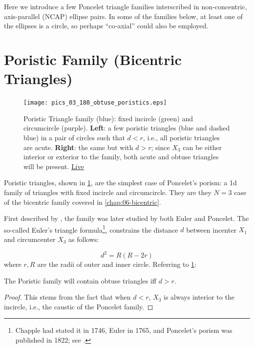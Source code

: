 Here we introduce a few Poncelet triangle families interscribed in non-concentric, axis-parallel (NCAP) ellipse pairs. In some of the families below, at least one of the ellipses is a circle, so perhaps ``co-axial'' could also be employed.

\section{Poristic Family (Bicentric Triangles)}

\begin{figure}
    \centering
    \texttt{[image: 
    pics\_03\_180\_obtuse\_poristics.eps]}
    \caption{Poristic Triangle family (blue): fixed incircle (green) and circumcircle (purple). \textbf{Left}: a few poristic triangles (blue and dashed blue) in a pair of circles such that $d<r$, i.e.,  all poristic triangles are acute. \textbf{Right}: the same but with $d>r$; since $X_3$ can be either interior or exterior to the family, both acute and obtuse triangles will be present. \href{https://bit.ly/3bg19iD}{Live}}
    \label{fig:03-poristic obtuse}
\end{figure}

Poristic triangles, shown in \cref{fig:03-poristic obtuse}, are the simplest case of Poncelet's porism: a 1d family of triangles with fixed incircle and circumcircle. They are they $N=3$ case of the bicentric family covered in \cref{chap:06-bicentric}.

First described by \cite{chapple1746-poristics}, the family was later studied by both Euler and Poncelet. The so-called Euler's triangle formula\footnote{Chapple had stated it in 1746, Euler in 1765, and Poncelet's porism was published in 1822; see \cite{centina15}.}, constrains the distance $d$ between incenter $X_1$ and circumcenter $X_3$ as follows:

\begin{equation}
d^2=R(R-2 r)
\label{eq:03-euler-poristic}
\end{equation}
where $r,R$ are the radii of outer and inner circle. Referring to \cref{fig:03-poristic obtuse}:

\begin{proposition}
The Poristic family will contain obtuse triangles iff $d>r$.
\end{proposition}

\begin{proof}
This stems from the fact that when $d<r$, $X_3$ is always interior to the incircle, i.e., the caustic of the Poncelet family. 
\end{proof}

